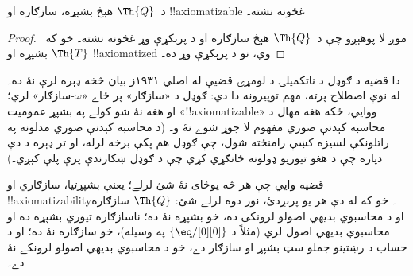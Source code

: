 \documentclass[../../../include/open-logic-section]{subfiles}
\begin{document}


\begin{thm}
د~$\Th{Q}$ هېڅ بشپړه، سازګاره او !!{axiomatizable} غځونه نشته۔
\end{thm}

\begin{proof}
موږ لا پوهېږو چې د~$\Th{Q}$ هېڅ سازګاره او د پرېکړې وړ غځونه
نشته۔ خو که~$\Th{T}$ بشپړه او !!{axiomatized} وي، نو د پرېکړې وړ
ده۔
\end{proof}

\begin{explain}
دا قضيه د ګوډل د ناتکميلۍ د لومړۍ قضيې له اصلي ۱۹۳۱ز بيان څخه ډېره
لرې نۀ ده۔ له نوې اصطلاح پرته، مهم توپيرونه دا دي: ګوډل د
«سازګار» پر ځاے «$\omega$-سازګار» لري؛ او هغه نۀ شو کولے په بشپړ
عموميت «!!{axiomatizable}» ووايي، ځکه هغه مهال د محاسبه کېدنې صوري
مفهوم لا جوړ شوے نۀ و۔ (د محاسبه کېدنې صوري مدلونه په راتلونکې
لسيزه کښې رامنځته شول، چې ګوډل هم پکې برخه لرله، او تر ډېره د دې
دپاره چې د هغو تيوريو ډولونه ځانګړي کړي چې د ګوډل ښکارندې پرې پلې
کېږي۔)

قضيه وايي چې هر څه يوځای نۀ شئ لرلے؛ يعنې بشپړتيا، سازګاري او
!!{axiomatizability}۔ خو که له دې هر يو پرېږدئ، نور دوه لرلے شئ:
$\Th{Q}$ سازګاره او د محاسبوي بديهي اصولو لرونکې ده، خو بشپړه نۀ
ده؛ ناسازګاره تيوري بشپړه ده او محاسبوي بديهي اصول لري (مثلاً د
$\{ \eq/[0][0] \}$ په وسيله)، خو سازګاره نۀ ده؛ او د حساب د رښتينو
جملو سټ بشپړ او سازګار دے، خو د محاسبوي بديهي اصولو لرونکے نۀ دے۔
\end{explain}
\end{document}

